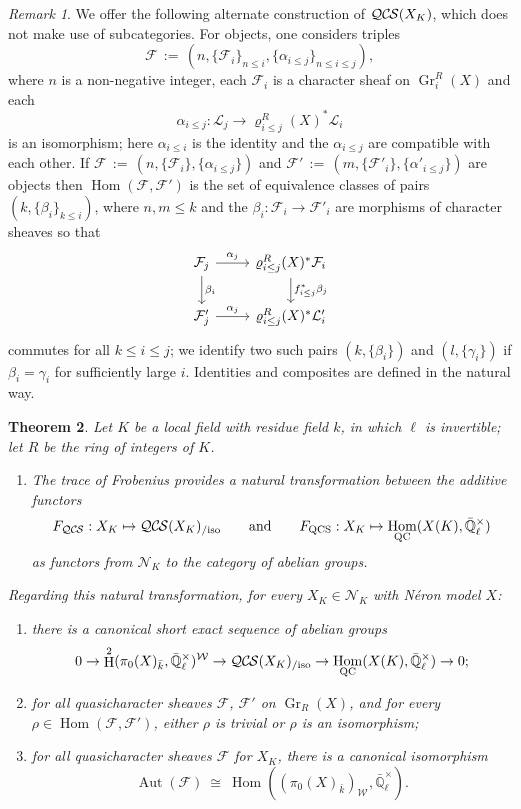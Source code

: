 \documentclass[10pt]{amsart}
\makeatletter
\theoremstyle{plain}
\newtheorem{theorem}{Theorem}[section]
\theoremstyle{definition}
\theoremstyle{remark}
\newtheorem{remark}[theorem]{Remark}
\newcommand{\EE}{\mathbb{\bar Q}_\ell}
\newcommand{\bFq}{\bar{k}}
\newcommand{\Fq}{k}
\newcommand{\EEx}{\EE^\times}
\newcommand{\Weil}[1]{\mathcal{W}_{#1}}
\DeclareMathOperator{\Aut}{Aut}
\DeclareMathOperator{\Hom}{Hom}
\DeclareMathOperator{\Gr}{Gr}
\DeclareMathOperator{\Hh}{H}
\newcommand{\ceq}{{\, :=\, }}
\newcommand{\iso}{{\ \cong\ }}
\newcommand{\cs}[1]{{\mathcal{#1}}}
\newcommand{\QCS}{{\mathcal{QC\hskip-0.8pt S}}}
\newcommand{\QCSiso}[1]{\QCS(#1)_{/\text{iso}}}
\newcommand{\labitem}[2]{
\def\@itemlabel{\textbf{#1}}
\item
\def\@currentlabel{#1}\label{#2}}
\makeatother
\begin{document}
\begin{remark}
We offer the following alternate construction of $\QCS(X_K)$, which does not make use of subcategories.
For objects, one considers triples 
\[
\cs{F} \ceq (n, \{\cs{F}_i\}_{n\leq i}, \{\alpha_{i \le j}\}_{n\le i \le j}),
\] where $n$
is a non-negative integer, each $\cs{F}_i$ is a character sheaf on $\Gr^R_i(X)$ and each 
\[
\alpha_{i \le j} : \cs{L}_j \to \varrho^R_{i \le j}(X)^* \cs{L}_i
\]
 is an isomorphism; here $\alpha_{i \le i}$ is the identity and the $\alpha_{i \le j}$ are compatible with each other.  
If $\cs{F} \ceq (n, \{\cs{F}_i\}, \{\alpha_{i \le j}\})$
and $\cs{F}' \ceq (m, \{\cs{F}'_i\}, \{\alpha'_{i \le j}\})$ are objects then $\Hom(\cs{F}, \cs{F}')$ is the set
of equivalence classes of pairs $(k, \{\beta_i\}_{k \le i})$, where $n,m \le k$ and the $\beta_i : \cs{F}_i \to \cs{F}'_i$ are
morphisms of character sheaves so that
\[
\begin{tikzcd}
\cs{F}_j \rar{\alpha_j} \dar{\beta_i} & \varrho^R_{i \le j}(X)^* \cs{F}_i \dar{f_{i \le j}^*\beta_j} \\
\cs{F}'_j \rar{\alpha_j} & \varrho^R_{i \le j}(X)^* \cs{L}'_i
\end{tikzcd}
\]
commutes for all $k\le i\le j$; we identify two such pairs $(k, \{\beta_i\})$ and $(l, \{\gamma_i\})$ if $\beta_i = \gamma_i$
for sufficiently large $i$.  Identities and composites are defined in the natural way.
\end{remark}


\begin{theorem}\label{thm:CSXK}
Let $K$ be a local field with residue field $\Fq$, in which $\ell$ is invertible; 
let $R$ be the ring of integers of $K$.
\begin{enumerate}
\labitem{(1)}{x1}
The trace of Frobenius provides a natural transformation between the additive functors
\[
F_{\QCS}: X_K \mapsto \QCSiso{X_K}
\qquad\text{and}\qquad
F_{\text{QCS}}: X_K \mapsto \Hom_{\text{QC}}(X(K),\EEx)
\]
as functors from $\mathcal{N}_K$ to the category of abelian groups.
\end{enumerate} 
Regarding this natural transformation, for every $X_K \in \mathcal{N}_K$ with N\'eron model $X$:
\begin{enumerate}[resume]
\labitem{(2)}{x2} there is a canonical short exact sequence of abelian groups 
\[
0 \to \Hh^2(\pi_0(X)_{\bFq},\EEx)^{\Weil{}} \to \QCSiso{X_K} \to \Hom_\text{QC}(X(K),\EEx) \to 0;
\] 
\labitem{(3)}{x3} for all quasicharacter sheaves $\cs{F}$, $\cs{F}'$ on $\Gr_R(X)$, and for every $\rho \in \Hom(\cs{F},\cs{F}')$, either $\rho$ is trivial or $\rho$ is an isomorphism;
\labitem{(4)}{x4} for all quasicharacter sheaves $\cs{F}$ for $X_K$, there is a canonical isomorphism
\[
\Aut(\cs{F}) \iso \Hom((\pi_0(X)_{\bFq})_{\Weil{}},\EEx).
\]
\end{enumerate}
\end{theorem}
\end{document}
